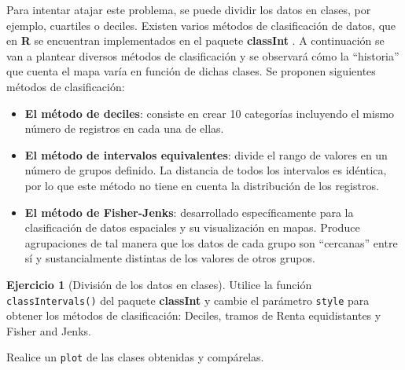 \documentclass[
]{book}
\theoremstyle{definition}
\theoremstyle{definition}
\theoremstyle{definition}
\newtheorem{exercise}{Ejercicio}[chapter]
\theoremstyle{definition}
\theoremstyle{remark}
\begin{document}
Para intentar atajar este problema, se puede dividir los datos en clases, por
ejemplo, cuartiles o deciles. Existen varios métodos de clasificación de datos,
que en \textbf{R} se encuentran implementados en el paquete \textbf{classInt}
\citep{R-classint}. A continuación se van a plantear diversos métodos de
clasificación y se observará cómo la ``historia'' que cuenta el mapa varía en
función de dichas clases. Se proponen siguientes métodos de clasificación:

\begin{itemize}
\item
  \textbf{El método de deciles}: consiste en crear 10 categorías incluyendo el
  mismo número de registros en cada una de ellas.
\item
  \textbf{El método de intervalos equivalentes}: divide el rango de valores en un
  número de grupos definido. La distancia de todos los intervalos es idéntica,
  por lo que este método no tiene en cuenta la distribución de los registros.
\item
  \textbf{El método de Fisher-Jenks}: desarrollado específicamente para la
  clasificación de datos espaciales y su visualización en mapas. Produce
  agrupaciones de tal manera que los datos de cada grupo son ``cercanas'' entre
  sí y sustancialmente distintas de los valores de otros grupos.
\end{itemize}

\begin{exercise}[División de los datos en clases]
\protect\hypertarget{exr:ex22}{}\label{exr:ex22}Utilice la función \texttt{classIntervals()} del paquete \textbf{classInt} y cambie el
parámetro \texttt{style} para obtener los métodos de clasificación: Deciles, tramos de
Renta equidistantes y Fisher and Jenks.

Realice un \texttt{plot} de las clases obtenidas y compárelas.
\end{exercise}
\end{document}
